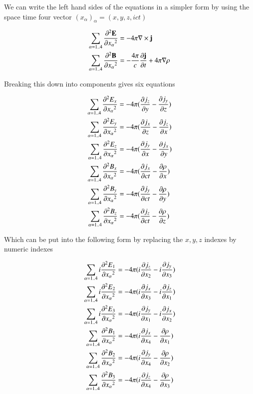 \documentclass{article}      %
\newcommand{\grad}[1]{\nabla#1}
\newcommand{\Curl}[1]{\nabla \times \mathbf{#1}}
\newcommand{\Ddt}[1]{ {{\partial{\mathbf{#1}}} \over {\partial{t}}}}
\newcommand{\dds}[2]{ {{\partial^2{#1}} \over {\partial{#2}^2}}}
\newcommand{\Dds}[2]{ {{\partial^2{\mathbf{#1}}} \over {\partial{#2}^2}}}
\newcommand{\D}[2] {{{\partial #2} \over {\partial #1}}}
\begin{document}
We 
can write the left hand sides of the equations in a simpler form by using the 
space time four vector $(x_\alpha)_\alpha = (x, y, z, ict)$

\begin{align*}
\sum_{\alpha = 1 .. 4}{\Dds{E} {x_\alpha}} &= - 4\pi \Curl{j} \\
\sum_{\alpha = 1 .. 4}{\Dds{B} {x_\alpha}} &= - {4\pi \over c} \Ddt{j} + 4\pi \grad{\rho}
\end{align*}

Breaking this down into components gives six equations




\begin{align*}
\sum_{\alpha = 1 .. 4}{\dds{E_x} {x_\alpha}} &= - 4\pi (\D {y}{j_z} - \D {z}{j_y}) \\
\sum_{\alpha = 1 .. 4}{\dds{E_y} {x_\alpha}} &= - 4\pi (\D {z}{j_x} - \D {x}{j_z}) \\
\sum_{\alpha = 1 .. 4}{\dds{E_z} {x_\alpha}} &= - 4\pi (\D {x}{j_y} - \D {y}{j_x}) \\
\sum_{\alpha = 1 .. 4}{\dds{B_x} {x_\alpha}} &= - 4\pi (\D {ct}{j_x} - \D{x}{\rho})\\
\sum_{\alpha = 1 .. 4}{\dds{B_y} {x_\alpha}} &= - 4\pi (\D {ct}{j_y} - \D{y}{\rho})\\
\sum_{\alpha = 1 .. 4}{\dds{B_z} {x_\alpha}} &= - 4\pi (\D {ct}{j_z} - \D{z}{\rho})
\end{align*}

Which can be put into the following form by replacing the $x, y, z$ indexes by numeric indexes

\begin{align*}
\sum_{\alpha = 1 .. 4}{i \dds{E_1} {x_\alpha}} &= - 4\pi (i \D {x_2}{j_z} - i \D {x_3}{j_y}) \\
\sum_{\alpha = 1 .. 4}{i \dds{E_2} {x_\alpha}} &= - 4\pi (i \D {x_3}{j_x} - i \D {x_1}{j_z}) \\
\sum_{\alpha = 1 .. 4}{i \dds{E_3} {x_\alpha}} &= - 4\pi (i \D {x_1}{j_y} - i \D {x_2}{j_x}) \\
\sum_{\alpha = 1 .. 4}{\dds{B_1} {x_\alpha}} &= - 4\pi (i \D {x_4}{j_x} - \D{x_1}{\rho})\\
\sum_{\alpha = 1 .. 4}{\dds{B_2} {x_\alpha}} &= - 4\pi (i \D {x_4}{j_y} - \D{x_2}{\rho})\\
\sum_{\alpha = 1 .. 4}{\dds{B_3} {x_\alpha}} &= - 4\pi (i \D {x_4}{j_z} - \D{x_3}{\rho})
\end{align*}
\end{document}
